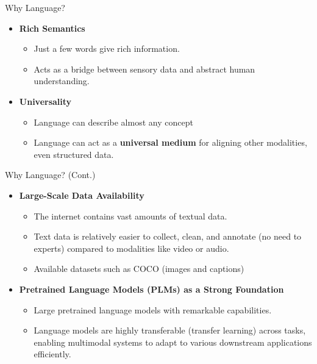\documentclass[serif, aspectratio=169]{beamer}
\begin{document}
\begin{frame}{Why Language?}
        \begin{itemize}
          \item \textbf{Rich Semantics}
          \begin{itemize}
              \item Just a few words give rich information.
              \item Acts as a bridge between sensory data and abstract human understanding.
          \end{itemize}
          
          \item  \textbf{Universality}
          \begin{itemize}
              \item Language can describe almost any concept
              \item Language can act as a \textbf{universal medium} for aligning other modalities, even structured data.
          \end{itemize} 
        \end{itemize}
\end{frame}


\begin{frame}{Why Language? (Cont.)}
        \begin{itemize}
          \item \textbf{Large-Scale Data Availability}
          \begin{itemize}
              \item The internet contains vast amounts of textual data.
              \item Text data is relatively easier to collect, clean, and annotate (no need to experts) compared to modalities like video or audio.
              \item Available datasets such as COCO (images and captions)
          \end{itemize}

          \item \textbf{Pretrained Language Models (PLMs) as a Strong Foundation}
          \begin{itemize}
              \item Large pretrained language models with remarkable capabilities.
              \item Language models are highly transferable (transfer learning) across tasks, enabling multimodal systems to adapt to various downstream applications efficiently.
          \end{itemize}
        \end{itemize}
\end{frame}
\end{document}

